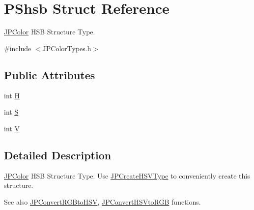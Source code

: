 \hypertarget{struct_p_shsb}{
\section{PShsb Struct Reference}
\label{struct_p_shsb}
}


\hyperlink{interface_j_p_color}{JPColor} HSB Structure Type.  




{\ttfamily \#include $<$JPColorTypes.h$>$}

\subsection*{Public Attributes}
\begin{DoxyCompactItemize}
\item 
int \hyperlink{struct_p_shsb_ad5bb7e0e1952e0c5d267079f99717af0}{H}
\item 
int \hyperlink{struct_p_shsb_a3ecb171e2b1b5bb178bcb9ea071ce0c6}{S}
\item 
int \hyperlink{struct_p_shsb_ab21a85f6069ee2e4409dfc5c61697ebe}{V}
\end{DoxyCompactItemize}


\subsection{Detailed Description}
\hyperlink{interface_j_p_color}{JPColor} HSB Structure Type. Use \hyperlink{_j_p_color_functions_8h_ac6031c5fd2d719a6b618d030c86cc6ac}{JPCreateHSVType} to conveniently create this structure. \begin{DoxySeeAlso}{See also}
\hyperlink{_j_p_color_convert_functions_8h_ab9d9002d48aff333c31d3b5c30512648}{JPConvertRGBtoHSV}, \hyperlink{_j_p_color_convert_functions_8h_a5dc60c232611ea3801fa48d1b77dc9f7}{JPConvertHSVtoRGB} functions. 
\end{DoxySeeAlso}


